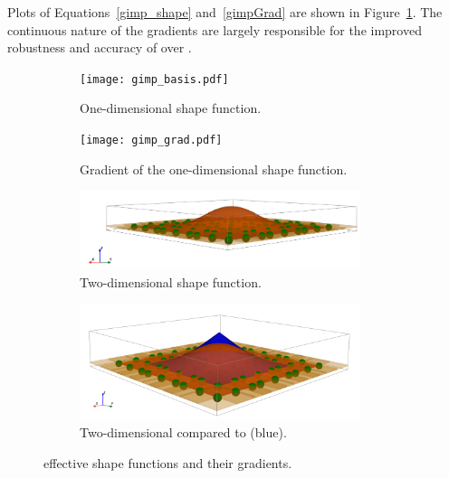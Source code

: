 Plots of Equations~\ref{gimp_shape} and~\ref{gimpGrad} are shown
in Figure~\ref{Fig:GIMP}.  The continuous nature of the gradients are largely responsible
for the improved robustness and accuracy of \GIMP over \MPM.
\begin{figure}[htbp!]
  \begin{subfigure}[t]{0.45\textwidth}
    \centering
    \texttt{[image: gimp\_basis.pdf]}
    \caption{One-dimensional shape function.}
  \end{subfigure}
  \begin{subfigure}[t]{0.45\textwidth}
    \centering
    \texttt{[image: gimp\_grad.pdf]}
    \caption{Gradient of the one-dimensional shape function.}
  \end{subfigure}
  \begin{subfigure}[t]{0.5\textwidth}
    \centering
    \includegraphics[width=0.9\textwidth]{Figs/mpm_basis/gimp_basis_only.png}
    \caption{Two-dimensional shape function.}
  \end{subfigure}
  \begin{subfigure}[t]{0.5\textwidth}
    \centering
    \includegraphics[width=0.9\textwidth]{Figs/mpm_basis/gimp_basis.png}
    \caption{Two-dimensional \GIMP compared to \MPM (blue).}
  \end{subfigure}
  \caption{\GIMP effective shape functions and their gradients.} 
  \label{Fig:GIMP}
\end{figure}
%

